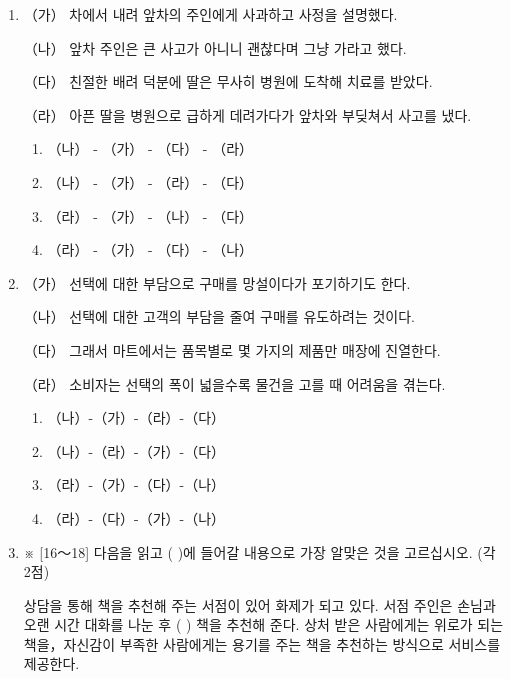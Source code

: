 \documentclass[12pt]{article}
\begin{document}
\begin{enumerate}[1.]
    \item
    \begin{mdframed}
    （가） 차에서 내려 앞차의 주인에게 사과하고 사정을 설명했다.

    （나） 앞차 주인은 큰 사고가 아니니 괜찮다며 그냥 가라고 했다.

    （다） 친절한 배려 덕분에 딸은 무사히 병원에 도착해 치료를 받았다.

    （라） 아픈 딸을 병원으로 급하게 데려가다가 앞차와 부딪쳐서 사고를 냈다.
    \end{mdframed}

    \begin{enumerate}[1)]
        \item （나） - （가） - （다） - （라）
        \item （나） - （가） - （라） - （다）
        \item （라） - （가） - （나） - （다）
        \item （라） - （가） - （다） - （나）
    \end{enumerate}


    \item

    \begin{mdframed}
    （가） 선택에 대한 부담으로 구매를 망설이다가 포기하기도 한다.

    （나） 선택에 대한 고객의 부담을 줄여 구매를 유도하려는 것이다.

    （다） 그래서 마트에서는 품목별로 몇 가지의 제품만 매장에 진열한다.

    （라） 소비자는 선택의 폭이 넓을수록 물건을 고를 때 어려움을 겪는다.
    \end{mdframed}

    \begin{enumerate}[1)]
        \item （나）-（가）-（라）-（다）
        \item （나）-（라）-（가）-（다）
        \item （라）-（가）-（다）-（나）
        \item （라）-（다）-（가）-（나）
    \end{enumerate}




    \item ※ [16～18] 다음을 읽고 (   )에 들어갈 내용으로 가장 알맞은 것을 고르십시오. (각 2점)


    \begin{mdframed}
    상담을 통해 책을 추천해 주는 서점이 있어 화제가 되고 있다. 서점
    주인은 손님과 오랜 시간 대화를 나눈 후 (     ) 책을 추천해
    준다. 상처 받은 사람에게는 위로가 되는 책을，자신감이 부족한 사람에게는
    용기를 주는 책을 추천하는 방식으로 서비스를 제공한다.
    \end{mdframed}


\end{enumerate}
\end{document}
